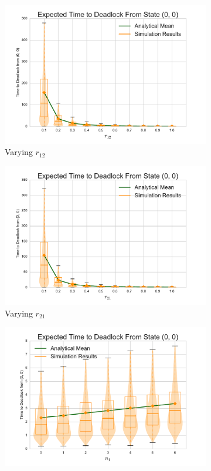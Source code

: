 \documentclass{article}
\begin{document}
\begin{figure}[!htbp]
\begin{subfigure}[b]{0.333\textwidth}
    \includegraphics[width=\textwidth]{images/varyr12_2Nms}
    \caption{Varying $r_{12}$}
    \label{fig:2Nms_r12}
  \end{subfigure}
  \begin{subfigure}[b]{0.333\textwidth}
    \includegraphics[width=\textwidth]{images/varyr21_2Nms}
    \caption{Varying $r_{21}$}
    \label{fig:2Nms_r21}
  \end{subfigure}
  \begin{center}
  \begin{subfigure}[b]{0.34\textwidth}
    \includegraphics[width=\textwidth]{images/varyn1_2Nms}

\end{subfigure}
\end{center}
\end{figure}
\end{document}
